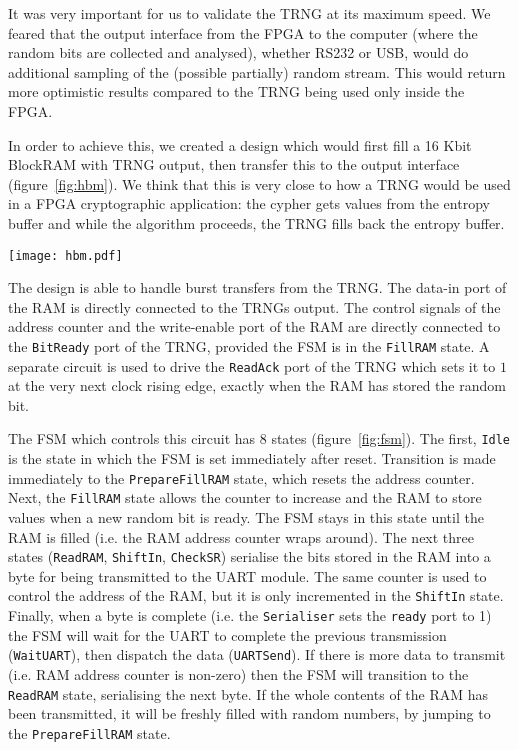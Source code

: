 \documentclass[conference]{IEEEtran}
\begin{document}
It was very important for us to validate the TRNG at its maximum speed. We feared that the output interface from the FPGA to the computer (where the random bits are collected and analysed), whether RS232 or USB, would do additional sampling of the (possible partially) random stream. This would return more optimistic results compared to the TRNG being used only inside the FPGA.

In order to achieve this, we created a design which would first fill a 16 Kbit BlockRAM with TRNG output, then transfer this to the output interface (figure~\ref{fig:hbm}). We think that this is very close to how a TRNG would be used in a FPGA cryptographic application: the cypher gets values from the entropy buffer and while the algorithm proceeds, the TRNG fills back the entropy buffer. 

\begin{figure*}
\centering
\texttt{[image: hbm.pdf]}
\caption{High-throughput Measurement Scheme}
\label{fig:hbm}
\end{figure*}

The design is able to handle burst transfers from the TRNG. The data-in port of the RAM is directly connected to the TRNGs output. The control signals of the address counter and the write-enable port of the RAM are directly connected to the {\tt BitReady} port of the TRNG, provided the FSM is in the {\tt FillRAM} state. A separate circuit is used to drive the {\tt ReadAck} port of the TRNG which sets it to $1$ at the very next clock rising edge, exactly when the RAM has stored the random bit.

The FSM which controls this circuit has 8 states (figure~\ref{fig:fsm}). The first, {\tt Idle} is the state in which the FSM is set immediately after reset. Transition is made immediately to the {\tt PrepareFillRAM} state, which resets the address counter. Next, the {\tt FillRAM} state allows the counter to increase and the RAM to store values when a new random bit is ready. The FSM stays in this state until the RAM is filled (i.e. the RAM address counter wraps around). The next three states ({\tt ReadRAM}, {\tt ShiftIn}, {\tt CheckSR}) serialise the bits stored in the RAM into a byte for being transmitted to the UART module. The same counter is used to control the address of the RAM, but it is only incremented in the {\tt ShiftIn} state. Finally, when a byte is complete (i.e. the {\tt Serialiser} sets the {\tt ready} port to 1) the FSM will wait for the UART to complete the previous transmission ({\tt WaitUART}), then dispatch the data ({\tt UARTSend}). If there is more data to transmit (i.e. RAM address counter is non-zero) then the FSM will transition to the {\tt ReadRAM} state, serialising the next byte. If the whole contents of the RAM has been transmitted, it will be freshly filled with random numbers, by jumping to the {\tt PrepareFillRAM} state.
\end{document}
